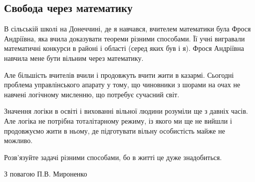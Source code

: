  
 
 
 
 

\subsection{Свобода через математику}

В сільській школі на Донеччині, де я навчався, вчителем математики була Фрося
Андріївна, яка вчила доказувати теореми різними способами. Її учні вигравали
математичні конкурси в районі і області (серед яких був і я). Фрося Андріївна
навчила мене бути вільним через математику. 

Але більшість вчителів вчили і продовжуть вчити жити в казармі. Сьогодні
проблема управлінського апарату у тому, що чиновники з шорами на очах не
навчені логічному мисленню, що потребує сучасний світ.

Значення логіки в освіті і вихованні вільної людини розуміли ще з давніх часів.
Але логіка не потрібна тоталітарному режиму, із якого ми ще не вийшли і
продовжуємо жити в ньому, де підготувати вільну особистість майже не можливо.

Розв'язуйте задачі різними способами, бо в житті це дуже знадобиться.

З повагою П.В. Мироненко
